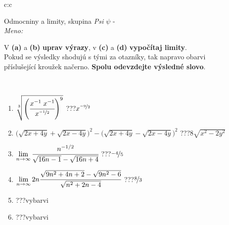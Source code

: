 \documentclass[10pt]{report}
\begin{document}
\newpage
\thispagestyle{empty}
\begin{tabular}{c:c}
\begin{minipage}[c][104.5mm][t]{0.5\linewidth}
\begin{center}
\vspace{7mm}
{\huge Odmocniny a limity, skupina \textit{Psi $\psi$} -}\\[5mm]
\textit{Meno:}\phantom{xxxxxxxxxxxxxxxxxxxxxxxxxxxxxxxxxxxxxxxxxxxxxxxxxxxxxxxxxxxxxxxxx}\\[5mm]
\begin{minipage}{0.95\linewidth}
\begin{center}
V \textbf{(a)} a \textbf{(b)} \textbf{uprav výrazy}, v \textbf{(c)} a \textbf{(d)} \textbf{vypočítaj limity}.\\Pokud se výsledky shodujú s tými za otazníky, tak napravo obarvi\\příslušející kroužek načerno. \textbf{Spolu odevzdejte výsledné slovo}.
\end{center}
\end{minipage}
\\[1mm]
\begin{minipage}{0.79\linewidth}
\begin{center}
\begin{varwidth}{\linewidth}
\begin{enumerate}
\small
\item $\sqrt[3]{\left(\cfrac{x^{-1}\;x^{-1}}{x^{\nicefrac{-1}{2}}}\right)^{9}}$\quad \dotfill\; ???\;\dotfill \quad $x^{\nicefrac{-9}{2}}$
\item {\footnotesize{\scriptsize$\big(\sqrt{2x+4y}+\sqrt{2x-4y}\big)^2-\big(\sqrt{2x+4y}-\sqrt{2x-4y}\big)^2$}\quad \dotfill\; ???\;\dotfill \quad $8\sqrt{x^2-2y^2}$}
\item $\lim\limits_{n\to\infty}\cfrac{n^{-1/2}}{\sqrt{16n-1}-\sqrt{16n+4}}$\quad \dotfill\; ???\;\dotfill \quad $\nicefrac{-4}{5}$
\item $\lim\limits_{n\to\infty}2n\cfrac{\sqrt{9n^2+4n+2}-\sqrt{9n^2-6}}{\sqrt{n^2+2n-4}}$\quad \dotfill\; ???\;\dotfill \quad $\nicefrac{8}{3}$
\item \quad \dotfill\; ???\;\dotfill \quad vybarvi
\item \quad \dotfill\; ???\;\dotfill \quad vybarvi
\end{enumerate}
\end{varwidth}
\end{center}
\end{minipage}
\begin{minipage}{0.20\linewidth}

\end{minipage}
\end{center}
\end{minipage}
\end{tabular}
\end{document}
